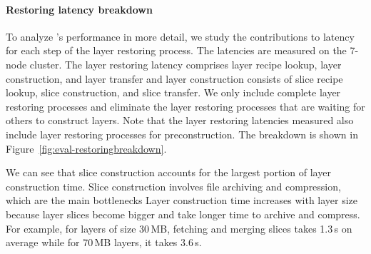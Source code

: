 \paragraph{Restoring latency breakdown}
%
To analyze \sysname{}'s performance in more detail, we study the contributions to latency
for each step of the layer restoring process.
%
The latencies are measured on the 7-node cluster.
%
The layer restoring latency comprises layer recipe lookup, layer construction, and layer transfer and
layer construction consists of slice recipe lookup, slice construction, and slice transfer.
%
%
We only include complete layer restoring processes and eliminate the layer restoring processes
that are waiting for others to construct layers.
%
%
Note that the layer restoring latencies measured also include layer restoring processes for preconstruction.
%
The breakdown is shown in Figure~\ref{fig:eval-restoringbreakdown}.

We can see that slice construction accounts for the largest portion of layer construction time.
%
Slice construction involves file archiving and compression, which are the main bottlenecks
Layer construction time increases with layer size because layer slices become bigger and
take longer time to archive and compress.
%
For example, for layers of size 30\,MB, fetching and merging slices takes 1.3\,s on average while
for 70\,MB layers, it takes 3.6\,s.

